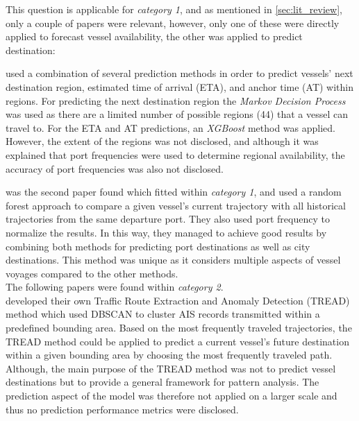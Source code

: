 
This question is applicable for \textit{category 1}, and as mentioned in \cref{sec:lit_review}, only a couple of papers were relevant, however, only one of these were directly applied to forecast vessel availability, the other was applied to predict destination:

\cite{lechtenberg2019} used a combination of several prediction methods in order to predict vessels’ next destination region, estimated time of arrival (ETA), and anchor time (AT) within regions. For predicting the next destination region the \textit{Markov Decision Process} was used as there are a limited number of possible regions (44) that a vessel can travel to. For the ETA and AT predictions, an \textit{XGBoost} method was applied. However, the extent of the regions was not disclosed, and although it was explained that port frequencies were used to determine regional availability, the accuracy of port frequencies was also not disclosed.


\cite{ZHANG2020102729} was the second paper found which fitted within \textit{category 1}, and used a random forest approach to compare a given vessel’s current trajectory with all historical trajectories from the same departure port. They also used port frequency to normalize the results. In this way, they managed to achieve good results by combining both methods for predicting port destinations as well as city destinations. This method was unique as it considers multiple aspects of vessel voyages compared to the other methods.\\

The following papers were found within \textit{category 2}.\\

\cite{pallotta} developed their own Traffic Route Extraction and Anomaly Detection (TREAD) method which used DBSCAN to cluster AIS records transmitted within a predefined bounding area. Based on the most frequently traveled trajectories, the TREAD method could be applied to predict a current vessel’s future destination within a given bounding area by choosing the most frequently traveled path. Although, the main purpose of the TREAD method was not to predict vessel destinations but to provide a general framework for pattern analysis. The prediction aspect of the model was therefore not applied on a larger scale and thus no prediction performance metrics were disclosed.

